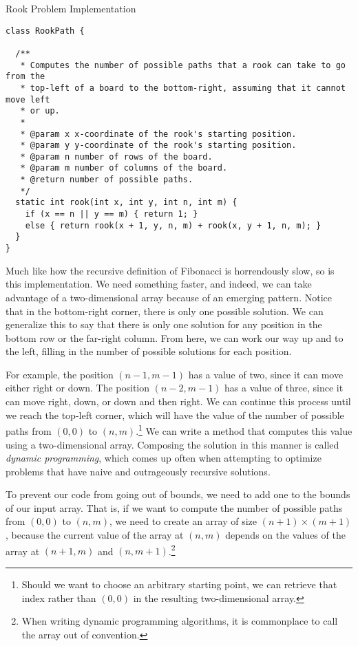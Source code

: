 \begin{cl}{Rook Problem Implementation}
\begin{lstlisting}[language=MyJava]
class RookPath {

  /**
   * Computes the number of possible paths that a rook can take to go from the
   * top-left of a board to the bottom-right, assuming that it cannot move left
   * or up.
   *
   * @param x x-coordinate of the rook's starting position.
   * @param y y-coordinate of the rook's starting position.
   * @param n number of rows of the board.
   * @param m number of columns of the board.
   * @return number of possible paths.
   */
  static int rook(int x, int y, int n, int m) {
    if (x == n || y == m) { return 1; }
    else { return rook(x + 1, y, n, m) + rook(x, y + 1, n, m); }
  }
}
\end{lstlisting}
\end{cl}

Much like how the recursive definition of Fibonacci is horrendously slow, so is this implementation. We need something faster, and indeed, we can take advantage of a two-dimensional array because of an emerging pattern. Notice that in the bottom-right corner, there is only one possible solution. We can generalize this to say that there is only one solution for any position in the bottom row or the far-right column. From here, we can work our way up and to the left, filling in the number of possible solutions for each position. 

For example, the position $(n - 1, m - 1)$ has a value of two, since it can move either right or down. The position $(n - 2, m - 1)$ has a value of three, since it can move right, down, or down and then right. We can continue this process until we reach the top-left corner, which will have the value of the number of possible paths from $(0, 0)$ to $(n, m)$.\footnote{Should we want to choose an arbitrary starting point, we can retrieve that index rather than $(0, 0)$ in the resulting two-dimensional array.} We can write a method that computes this value using a two-dimensional array. Composing the solution in this manner is called \textit{dynamic programming}, which comes up often when attempting to optimize problems that have naive and outrageously recursive solutions.

To prevent our code from going out of bounds, we need to add one to the bounds of our input array. That is, if we want to compute the number of possible paths from $(0, 0)$ to $(n, m)$, we need to create an array of size $(n + 1) \times (m + 1)$, because the current value of the array at $(n, m)$ depends on the values of the array at $(n + 1, m)$ and $(n, m + 1)$.\footnote{When writing dynamic programming algorithms, it is commonplace to call the array  out of convention.} 

